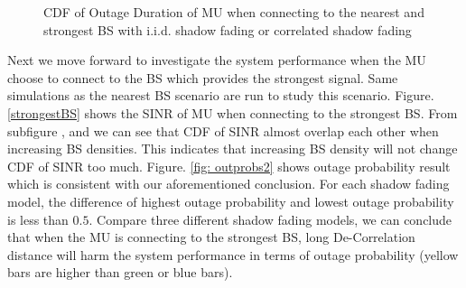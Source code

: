 \documentclass[journal,comsoc]{IEEEtran}
\begin{document}
\begin{figure}
\centering
{}
\hfil
{}
\hfil
{}
\hfil
{}
\caption{CDF of Outage Duration of MU when connecting to the nearest and strongest BS with i.i.d. shadow fading or correlated shadow fading}
\label{NBOD}
\end{figure}
\par Next we move forward to investigate the system performance when the MU choose to connect to the BS which provides the strongest signal. Same simulations as the nearest BS scenario are run to study this scenario. Figure. \ref{strongestBS} shows the SINR of MU when connecting to the strongest BS. From subfigure ,  and  we can see that CDF of SINR almost overlap each other when increasing BS densities. This indicates that increasing BS density will not change CDF of SINR too much. Figure. \ref{fig: outprobs2} shows outage probability result which is consistent with our aforementioned conclusion. For each shadow fading model, the difference of highest outage probability and lowest outage probability is less than $0.5$. Compare three different shadow fading models, we can conclude that when the MU is connecting to the strongest BS, long De-Correlation distance will harm the system performance in terms of outage probability (yellow bars are higher than green or blue bars). 
\end{document}
